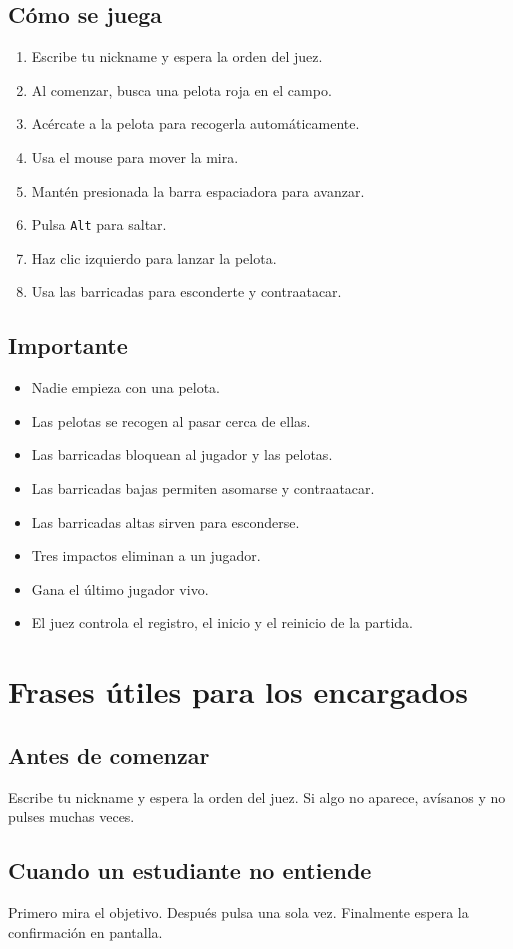 \documentclass[12pt,a4paper]{article}
\newcommand{\subtitulo}[1]{\subsection*{#1}}
\begin{document}
\subtitulo{Cómo se juega}
\begin{enumerate}
  \item Escribe tu nickname y espera la orden del juez.
  \item Al comenzar, busca una pelota roja en el campo.
  \item Acércate a la pelota para recogerla automáticamente.
  \item Usa el mouse para mover la mira.
  \item Mantén presionada la barra espaciadora para avanzar.
  \item Pulsa \texttt{Alt} para saltar.
  \item Haz clic izquierdo para lanzar la pelota.
  \item Usa las barricadas para esconderte y contraatacar.
\end{enumerate}

\subtitulo{Importante}
\begin{itemize}
  \item Nadie empieza con una pelota.
  \item Las pelotas se recogen al pasar cerca de ellas.
  \item Las barricadas bloquean al jugador y las pelotas.
  \item Las barricadas bajas permiten asomarse y contraatacar.
  \item Las barricadas altas sirven para esconderse.
  \item Tres impactos eliminan a un jugador.
  \item Gana el último jugador vivo.
  \item El juez controla el registro, el inicio y el reinicio de la partida.
\end{itemize}

\section{Frases útiles para los encargados}

\subtitulo{Antes de comenzar}
\begin{tcolorbox}[colback=gris,colframe=azul]
Escribe tu nickname y espera la orden del juez. Si algo no aparece, avísanos y no pulses muchas veces.
\end{tcolorbox}

\subtitulo{Cuando un estudiante no entiende}
\begin{tcolorbox}[colback=gris,colframe=azul]
Primero mira el objetivo. Después pulsa una sola vez. Finalmente espera la confirmación en pantalla.
\end{tcolorbox}
\end{document}
